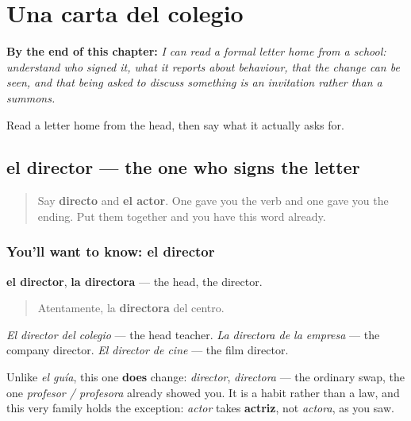 
\chapter{Una carta del colegio}
\label{ch:es-informe}

\begin{chapteropening}
\textbf{By the end of this chapter:} \emph{I can read a formal letter home from a school: understand who signed it, what it reports about behaviour, that the change can be seen, and that being asked to discuss something is an invitation rather than a summons.}

Read a letter home from the head, then say what it actually asks for.
\end{chapteropening}

\section[el director / la directora]{el director — the one who signs the letter}

\label{lesson:ES-C466-director}



\begin{quote}
Say \textbf{directo} and \textbf{el actor}. One gave you the verb and one gave you the ending. Put them together and you have this word already.
\end{quote}

\subsection*{You'll want to know: el director}
\textbf{el director}, \textbf{la directora} — the head, the director.

\begin{quote}
Atentamente, la \textbf{directora} del centro.
\end{quote}

\emph{El director del colegio} — the head teacher. \emph{La directora de la empresa} — the company director. \emph{El director de cine} — the film director.

Unlike \emph{el guía}, this one \textbf{does} change: \emph{director}, \emph{directora} — the ordinary swap, the one \emph{profesor / profesora} already showed you. It is a habit rather than a law, and this very family holds the exception: \emph{actor} takes \textbf{actriz}, not \emph{actora}, as you saw.

